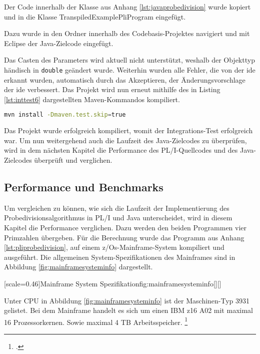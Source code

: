 Der Code innerhalb der Klasse aus Anhang \ref{lst:javaprobedivision} wurde kopiert und in die Klasse TranspiledExamplePliProgram eingefügt. 

Dazu wurde in den Ordner  innerhalb des Codebasis-Projektes navigiert und mit Eclipse der Java-Zielcode eingefügt.

Das Casten des Parameters wird aktuell nicht unterstützt, weshalb der Objekttyp händisch
in \verb+double+ geändert wurde. Weiterhin wurden alle Fehler, die von der \ac{ide} erkannt wurden, automatisch durch das Akzeptieren, der Änderungsvorschlage der  \ac{ide}  verbessert.
Das Projekt wird nun erneut mithilfe des in Listing \ref{lst:inttest6} dargestellten Maven-Kommandos kompiliert.

\begin{lstlisting}[language=Bash, caption=Kompilieren des Projekts, label={lst:inttest6}]
mvn install -Dmaven.test.skip=true
\end{lstlisting}

Das Projekt wurde erfolgreich kompiliert, womit der Integrations-Test erfolgreich war. Um nun weitergehend auch die Laufzeit des Java-Zielcodes zu überprüfen, wird in dem nächsten Kapitel die Performance des PL/I-Quellcodes und des Java-Zielcodes überprüft und verglichen. 
\pagebreak


\subsection{Performance und Benchmarks}
Um vergleichen zu können, wie sich die Laufzeit der Implementierung des Probedivisionsalgorithmus in PL/I und Java unterscheidet, wird in diesem Kapitel die Performance verglichen. 
Dazu werden den beiden Programmen vier Primzahlen übergeben. Für die Berechnung wurde das Programm aus Anhang \ref{lst:pliprobedivision}, auf einem z/Os-Mainframe-System kompiliert und ausgeführt. 
Die allgemeinen System-Spezifikationen des Mainframes sind in Abbildung \ref{fig:mainframesysteminfo} dargestellt.

[scale=0.46]{Mainframe System Spezifikation}{fig:mainframesysteminfo}[][]

Unter CPU in Abbildung \ref{fig:mainframesysteminfo} ist der Maschinen-Typ 3931 gelistet. Bei dem Mainframe handelt es sich um einen IBM z16 A02 mit
maximal 16 Prozessorkernen. Sowie maximal 4 TB Arbeitsspeicher. \footcite{z16}

